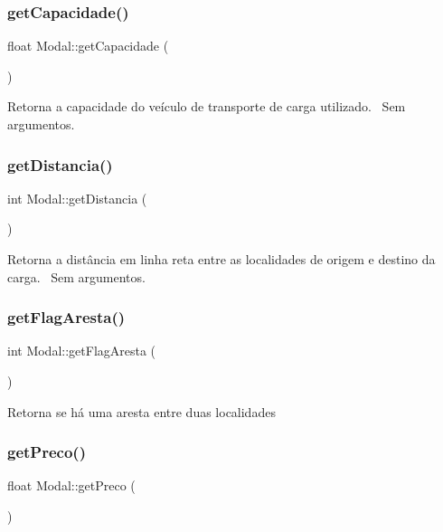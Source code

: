 \subsubsection{\texorpdfstring{get\+Capacidade()}{getCapacidade()}}
{\footnotesize\ttfamily float Modal\+::get\+Capacidade (\begin{DoxyParamCaption}{ }\end{DoxyParamCaption})}

Retorna a capacidade do veículo de transporte de carga utilizado.~\newline
Sem argumentos.\mbox{\label{classModal_a1eedb4dfdddd81a5a7c7b3203e50e68c}} 
\subsubsection{\texorpdfstring{get\+Distancia()}{getDistancia()}}
{\footnotesize\ttfamily int Modal\+::get\+Distancia (\begin{DoxyParamCaption}{ }\end{DoxyParamCaption})}

Retorna a distância em linha reta entre as localidades de origem e destino da carga.~\newline
Sem argumentos.\mbox{\label{classModal_a6fcee61fe1de7099605ff95707edaaa4}} 
\subsubsection{\texorpdfstring{get\+Flag\+Aresta()}{getFlagAresta()}}
{\footnotesize\ttfamily int Modal\+::get\+Flag\+Aresta (\begin{DoxyParamCaption}{ }\end{DoxyParamCaption})}

Retorna se há uma aresta entre duas localidades\mbox{\label{classModal_ae124094018f5e049d5137a8eec893a79}} 
\subsubsection{\texorpdfstring{get\+Preco()}{getPreco()}}
{\footnotesize\ttfamily float Modal\+::get\+Preco (\begin{DoxyParamCaption}{ }\end{DoxyParamCaption})}

